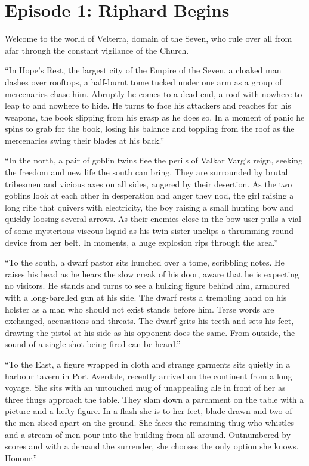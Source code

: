 \section{Episode 1: Riphard Begins}

Welcome to the world of Velterra, domain of the Seven, who rule over all from afar through the constant vigilance of the Church.

“In Hope’s Rest, the largest city of the Empire of the Seven, a cloaked man dashes over rooftops, a half-burnt tome tucked under one arm as a group of mercenaries chase him. Abruptly he comes to a dead end, a roof with nowhere to leap to and nowhere to hide. He turns to face his attackers and reaches for his weapons, the book slipping from his grasp as he does so. In a moment of panic he spins to grab for the book, losing his balance and toppling from the roof as the mercenaries swing their blades at his back.”

“In the north, a pair of goblin twins flee the perils of Valkar Varg’s reign, seeking the freedom and new life the south can bring. They are surrounded by brutal tribesmen and vicious axes on all sides, angered by their desertion. As the two goblins look at each other in desperation and anger they nod, the girl raising a long rifle that quivers with electricity, the boy raising a small hunting bow and quickly loosing several arrows. As their enemies close in the bow-user pulls a vial of some mysterious viscous liquid as his twin sister unclips a thrumming round device from her belt. In moments, a huge explosion rips through the area.”

“To the south, a dwarf pastor sits hunched over a tome, scribbling notes. He raises his head as he hears the slow creak of his door, aware that he is expecting no visitors. He stands and turns to see a hulking figure behind him, armoured with a long-barelled gun at his side. The dwarf rests a trembling hand on his holster as a man who should not exist stands before him. Terse words are exchanged, accusations and threats. The dwarf grits his teeth and sets his feet, drawing the pistol at his side as his opponent does the same. From outside, the sound of a single shot being fired can be heard.”

“To the East, a figure wrapped in cloth and strange garments sits quietly in a harbour tavern in Port Averdale, recently arrived on the continent from a long voyage. She sits with an untouched mug of unappealing ale in front of her as three thugs approach the table. They slam down a parchment on the table with a picture and a hefty figure. In a flash she is to her feet, blade drawn and two of the men sliced apart on the ground. She faces the remaining thug who whistles and a stream of men pour into the building from all around. Outnumbered by scores and with a demand the surrender, she chooses the only option she knows. Honour.”

